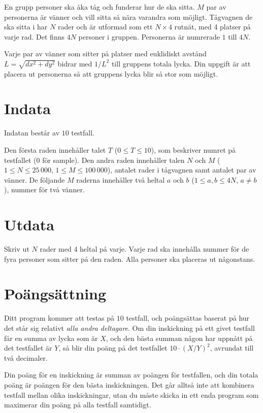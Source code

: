 En grupp personer ska åka tåg och funderar hur de ska sitta.
$M$ par av personerna är vänner och vill sitta så nära varandra som möjligt.
Tågvagnen de ska sitta i har $N$ rader och är utformad som ett $N \times 4$ rutnät, med 4 platser på varje rad.
Det finns $4N$ personer i gruppen.
Personerna är numrerade $1$ till $4N$.

Varje par av vänner som sitter på platser med euklidiskt avstånd $L = \sqrt{dx^2 + dy^2}$
bidrar med $1/L^2$ till gruppens totala lycka.
Din uppgift är att placera ut personerna så att gruppens lycka blir så stor som möjligt.

\section*{Indata}
Indatan består av $10$ testfall.

Den första raden innehåller talet $T$ ($0 \le T \le 10$), som beskriver numret på testfallet ($0$ för sample).
Den andra raden innehåller talen $N$ och $M$ ($1 \le N \le 25\,000$, $1 \le M \le 100\,000$), antalet rader i tågvagnen samt antalet par av vänner.
De följande $M$ raderna innehåller två heltal $a$ och $b$ ($1 \le a,b \le 4N$, $a \ne b$), nummer för två vänner.

\section*{Utdata}
Skriv ut $N$ rader med 4 heltal på varje.
Varje rad ska innehålla nummer för de fyra personer som sitter på den raden.
Alla personer ska placeras ut någonstans.

\section*{Poängsättning}
Ditt program kommer att testas på $10$ testfall, och poängsättas baserat på hur det står sig relativt \emph{alla andra deltagare}.
Om din inskickning på ett givet testfall får en summa av lycka som är $X$, och den bästa summan någon har uppnått på det testfallet är $Y$,
så blir din poäng på det testfallet $10 \cdot (X / Y)^2$, avrundat till två decimaler.

Din poäng för en inskickning är summan av poängen för testfallen, och din totala poäng är poängen för den bästa inskickningen.
Det går alltså inte att kombinera testfall mellan olika inskickningar, utan du måste skicka in ett enda program som
maximerar din poäng på alla testfall samtidigt.

